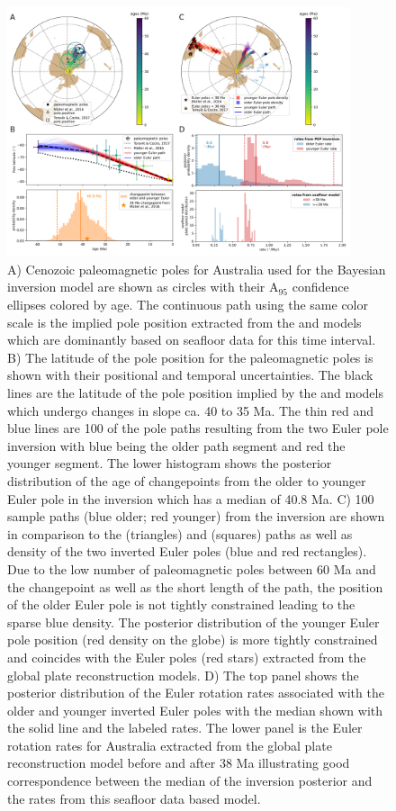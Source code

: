 \documentclass[11pt,letterpaper]{article}
\begin{document}
\begin{figure}
\includegraphics[width=0.9\textwidth]{fig_aus_inversion.png}
\caption{A) Cenozoic paleomagnetic poles for Australia used for the Bayesian inversion model are shown as circles with their A$_{95}$ confidence ellipses colored by age. The continuous path using the same color scale is the implied pole position extracted from the \cite{Muller2016a} and \cite{Torsvik2017a} models which are dominantly based on seafloor data for this time interval. B) The latitude of the pole position for the paleomagnetic poles is shown with their positional and temporal uncertainties. The black lines are the latitude of the pole position implied by the \cite{Muller2016a} and \cite{Torsvik2017a} models which undergo changes in slope ca. 40 to 35 Ma. The thin red and blue lines are 100 of the pole paths resulting from the two Euler pole inversion with blue being the older path segment and red the younger segment. The lower histogram shows the posterior distribution of the age of changepoints from the older to younger Euler pole in the inversion which has a median of 40.8 Ma. C) 100 sample paths (blue older; red younger) from the inversion are shown in comparison to the \cite{Muller2016a} (triangles) and \cite{Torsvik2017a} (squares) paths as well as density of the two inverted Euler poles (blue and red rectangles). Due to the low number of paleomagnetic poles between 60 Ma and the changepoint as well as the short length of the path, the position of the older Euler pole is not tightly constrained leading to the sparse blue density. The posterior distribution of the younger Euler pole position (red density on the globe) is more tightly constrained and coincides with the Euler poles (red stars) extracted from the global plate reconstruction models. D) The top panel shows the posterior distribution of the Euler rotation rates associated with the older and younger inverted Euler poles with the median shown with the solid line and the labeled rates. The lower panel is the Euler rotation rates for Australia extracted from the \cite{Muller2016a} global plate reconstruction model before and after 38 Ma illustrating good correspondence between the median of the inversion posterior and the rates from this seafloor data based model.}
\label{fig:Aus_Cenozoic_track}
\end{figure}
\end{document}
